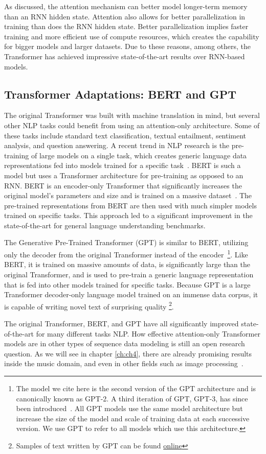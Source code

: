 As discussed, the attention mechanism can better model longer-term memory than an RNN hidden state. Attention also allows for better parallelization in training than does the RNN hidden state. Better parallelization implies faster training and more efficient use of compute resources, which creates the capability for bigger models and larger datasets. Due to these reasons, among others, the Transformer has achieved impressive state-of-the-art results over RNN-based models. 

\subsection{Transformer Adaptations: BERT and GPT}
The original Transformer was built with machine translation in mind, but several other NLP tasks could benefit from using an attention-only architecture. Some of these tasks include standard text classification, textual entailment, sentiment analysis, and question answering. A recent trend in NLP research is the pre-training of large models on a single task, which creates generic language data representations fed into models trained for a specific task~\cite{peters2018deep}. BERT is such a model but uses a Transformer architecture for pre-training as opposed to an RNN. BERT is an encoder-only Transformer that significantly increases the original model's parameters and size and is trained on a massive dataset~\cite{devlin2018bert}. The pre-trained representations from BERT are then used with much simpler models trained on specific tasks. This approach led to a significant improvement in the state-of-the-art for general language understanding benchmarks.  

The Generative Pre-Trained Transformer (GPT) is similar to BERT, utilizing only the decoder from the original Transformer instead of the encoder~\cite{radford2019language}\footnote{The model we cite here is the second version of the GPT architecture and is canonically known as GPT-2. A third iteration of GPT, GPT-3, has since been introduced~\cite{brown2020language}. All GPT models use the same model architecture but increase the size of the model and scale of training data at each successive version. We use GPT to refer to all models which use this architecture.}. Like BERT, it is trained on massive amounts of data, is significantly large than the original Transformer, and is used to pre-train a generic language representation that is fed into other models trained for specific tasks. Because GPT is a large Transformer decoder-only language model trained on an immense data corpus, it is capable of writing novel text of surprising quality%
\footnote{Samples of text written by GPT can be found \href{https://openai.com/blog/better-language-models/}{online}}. 

The original Transformer, BERT, and GPT have all significantly improved state-of-the-art for many different tasks NLP. How effective attention-only Transformer models are in other types of sequence data modeling is still an open research question. As we will see in chapter \ref{ch:ch4}, there are already promising results inside the music domain, and even in other fields such as image processing~\cite{dosovitskiy2020image}. 


 